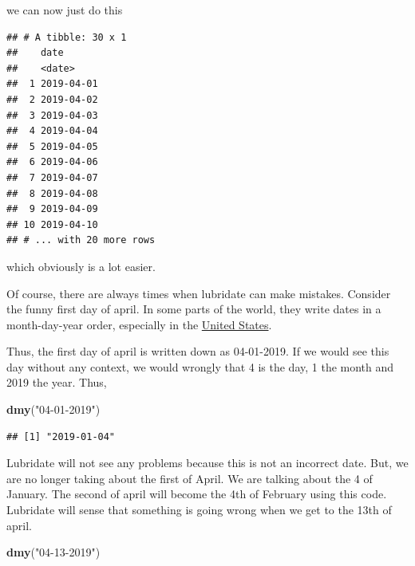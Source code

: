 \documentclass[]{tufte-book}
\newenvironment{Shaded}{}{}
\newcommand{\DataTypeTok}[1]{\textcolor[rgb]{0.56,0.13,0.00}{#1}}
\newcommand{\KeywordTok}[1]{\textcolor[rgb]{0.00,0.44,0.13}{\textbf{#1}}}
\newcommand{\NormalTok}[1]{#1}
\newcommand{\OperatorTok}[1]{\textcolor[rgb]{0.40,0.40,0.40}{#1}}
\newcommand{\StringTok}[1]{\textcolor[rgb]{0.25,0.44,0.63}{#1}}
\begin{document}
we can now just do this

\begin{Shaded}
\end{Shaded}

\begin{verbatim}
## # A tibble: 30 x 1
##    date      
##    <date>    
##  1 2019-04-01
##  2 2019-04-02
##  3 2019-04-03
##  4 2019-04-04
##  5 2019-04-05
##  6 2019-04-06
##  7 2019-04-07
##  8 2019-04-08
##  9 2019-04-09
## 10 2019-04-10
## # ... with 20 more rows
\end{verbatim}

which obviously is a lot easier.

Of course, there are always times when lubridate can make mistakes. Consider the funny first day of april. In some parts of the world, they write dates in a month-day-year order, especially in the \href{https://en.wikipedia.org/wiki/Date_and_time_notation_in_the_United_States}{United States}.

Thus, the first day of april is written down as 04-01-2019. If we would see this day without any context, we would wrongly that 4 is the day, 1 the month and 2019 the year. Thus,

\begin{Shaded}
\begin{Highlighting}[]
\KeywordTok{dmy}\NormalTok{(}\StringTok{"04-01-2019"}\NormalTok{)}
\end{Highlighting}
\end{Shaded}

\begin{verbatim}
## [1] "2019-01-04"
\end{verbatim}

Lubridate will not see any problems because this is not an incorrect date. But, we are no longer taking about the first of April. We are talking about the 4 of January. The second of april will become the 4th of February using this code. Lubridate will sense that something is going wrong when we get to the 13th of april.

\begin{Shaded}
\begin{Highlighting}[]
\KeywordTok{dmy}\NormalTok{(}\StringTok{"04-13-2019"}\NormalTok{)}
\end{Highlighting}
\end{Shaded}
\end{document}
